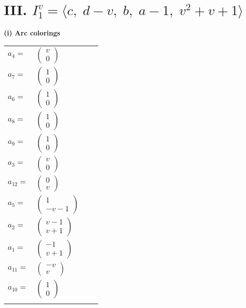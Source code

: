 \documentclass[1p]{elsarticle_modified}
\theoremstyle{definition}
\begin{document}
\centering \section*{III. $I^v_{1}= \langle c,\;d- v,\;b,\;a-1,\;v^2+v+1 \rangle$}
\flushleft \textbf{(i) Arc colorings}\\
\begin{tabular}{m{7pt} m{180pt} m{7pt} m{180pt} }
\flushright $a_{4}=$&$\begin{pmatrix}v\\0\end{pmatrix}$ \\
\flushright $a_{7}=$&$\begin{pmatrix}1\\0\end{pmatrix}$ \\
\flushright $a_{6}=$&$\begin{pmatrix}1\\0\end{pmatrix}$ \\
\flushright $a_{8}=$&$\begin{pmatrix}1\\0\end{pmatrix}$ \\
\flushright $a_{9}=$&$\begin{pmatrix}1\\0\end{pmatrix}$ \\
\flushright $a_{3}=$&$\begin{pmatrix}v\\0\end{pmatrix}$ \\
\flushright $a_{12}=$&$\begin{pmatrix}0\\v\end{pmatrix}$ \\
\flushright $a_{5}=$&$\begin{pmatrix}1\\- v-1\end{pmatrix}$ \\
\flushright $a_{2}=$&$\begin{pmatrix}v-1\\v+1\end{pmatrix}$ \\
\flushright $a_{1}=$&$\begin{pmatrix}-1\\v+1\end{pmatrix}$ \\
\flushright $a_{11}=$&$\begin{pmatrix}- v\\v\end{pmatrix}$ \\
\flushright $a_{10}=$&$\begin{pmatrix}1\\0\end{pmatrix}$\\&\end{tabular}
\end{document}
